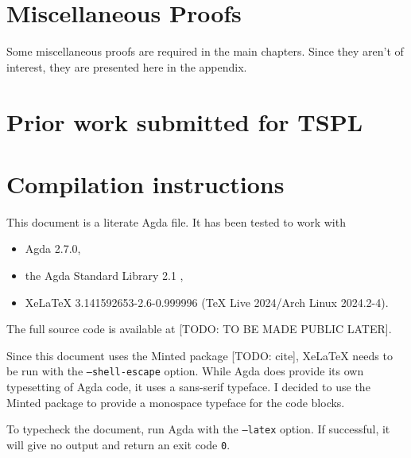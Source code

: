 \documentclass[logo,bsc,singlespacing,parskip,online]{infthesis}
\begin{document}
\appendix

\chapter{Miscellaneous Proofs}
\label{appendix:misc_proofs}

Some miscellaneous proofs are required in the main chapters. Since they aren't of interest, they are presented here in the appendix.



\chapter{Prior work submitted for TSPL}
\label{appendix:tspl}


\chapter{Compilation instructions}
\label{appendix:compilation_instructions}

This document is a literate Agda file. It has been tested to work with
\begin{itemize}
  \item Agda 2.7.0,
  \item the Agda Standard Library 2.1 \citep{the_agda_community_agda_2024},
  \item XeLaTeX 3.141592653-2.6-0.999996 (TeX Live 2024/Arch Linux 2024.2-4).
\end{itemize}

The full source code is available at [TODO: TO BE MADE PUBLIC LATER].

Since this document uses the Minted package [TODO: cite], XeLaTeX needs to be run with the
\texttt{--shell-escape} option. While Agda does provide its own typesetting of Agda code, it uses a
sans-serif typeface. I decided to use the Minted package to provide a monospace typeface for the
code blocks.

To typecheck the document, run Agda with the \texttt{--latex} option. If successful, it will give no
output and return an exit code \texttt{0}.
\end{document}

